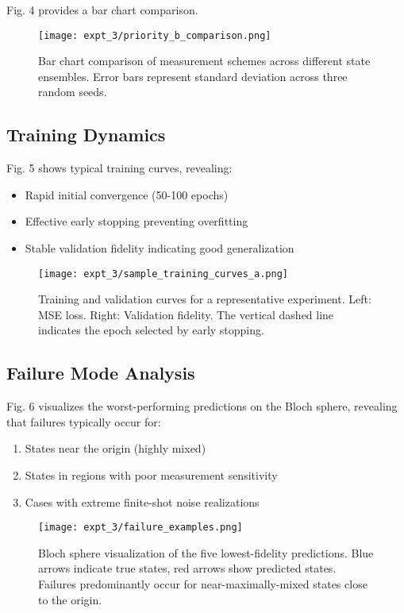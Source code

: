 \documentclass[conference]{IEEEtran}
\begin{document}
Fig. 4 provides a bar chart comparison.

\begin{figure}[t]
\centering
\texttt{[image: expt\_3/priority\_b\_comparison.png]}
\caption{Bar chart comparison of measurement schemes across different state ensembles. Error bars represent standard deviation across three random seeds.}
\label{fig:measurement_comparison}
\end{figure}

\subsection{Training Dynamics}

Fig. 5 shows typical training curves, revealing:
\begin{itemize}
    \item Rapid initial convergence (50-100 epochs)
    \item Effective early stopping preventing overfitting
    \item Stable validation fidelity indicating good generalization
\end{itemize}

\begin{figure}[t]
\centering
\texttt{[image: expt\_3/sample\_training\_curves\_a.png]}
\caption{Training and validation curves for a representative experiment. Left: MSE loss. Right: Validation fidelity. The vertical dashed line indicates the epoch selected by early stopping.}
\label{fig:training_curves}
\end{figure}

\subsection{Failure Mode Analysis}

Fig. 6 visualizes the worst-performing predictions on the Bloch sphere, revealing that failures typically occur for:
\begin{enumerate}
    \item States near the origin (highly mixed)
    \item States in regions with poor measurement sensitivity
    \item Cases with extreme finite-shot noise realizations
\end{enumerate}

\begin{figure}[t]
\centering
\texttt{[image: expt\_3/failure\_examples.png]}
\caption{Bloch sphere visualization of the five lowest-fidelity predictions. Blue arrows indicate true states, red arrows show predicted states. Failures predominantly occur for near-maximally-mixed states close to the origin.}
\label{fig:failure_analysis}
\end{figure}
\end{document}
